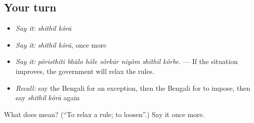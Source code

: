 \subsection*{Your turn}
\begin{itemize}
\raggedright
  \item \emph{Say it:} \emph{shithil kôrā}
  \item \emph{Say it:} \emph{shithil kôrā}, once more
  \item \emph{Say it:} \emph{pôristhiti bhālo hôle sôrkār niyôm shithil kôrbe.} — If the situation improves, the government will relax the rules.
  \item \emph{Recall:} say the Bengali for an exception, then the Bengali for to impose, then say \emph{shithil kôrā} again
\end{itemize}

\begin{tcolorbox}[breakable,colback=teal!4,colframe=teal!35!black,title={Before you move on}]
What does   mean? (\textquotedblleft{}To relax a rule; to loosen\textquotedblright{}.) Say it once more.
\end{tcolorbox}
